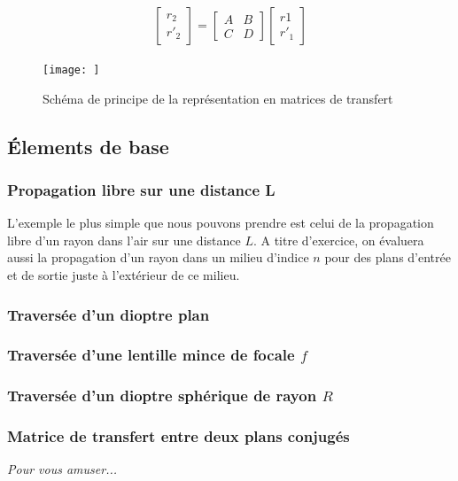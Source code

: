 \documentclass[a4paper]{book}
\begin{document}
\begin{gather}
 \begin{bmatrix} r_2 \\ r'_2 \end{bmatrix}
 =
  \begin{bmatrix}
   A & B \\
   C & D 
   \end{bmatrix}
   \begin{bmatrix} r1 \\ r'_1 \end{bmatrix}
\end{gather}

\begin{figure}[!htbp]
\begin{center}
\texttt{[image: ]}
\end{center}
\caption{Schéma de principe de la représentation en matrices de transfert}
\label{fig:matrix}
\end{figure}


\subsection{\'Elements de base}\label{subsec:el_base}

\subsubsection{Propagation libre sur une distance L}
L'exemple le plus simple que nous pouvons prendre est celui de la propagation libre d'un rayon dans l'air sur une distance $L$. A titre d'exercice, on évaluera aussi la propagation d'un rayon dans un milieu d'indice $n$ pour des plans d'entrée et de sortie juste à l'extérieur de ce milieu.
\subsubsection{Traversée d'un dioptre plan}
\subsubsection{Traversée d'une lentille mince de focale $f$}
\subsubsection{Traversée d'un dioptre sphérique de rayon $R$}
\subsubsection{Matrice de transfert entre deux plans conjugés}
\textit{Pour vous amuser...}
\end{document}
